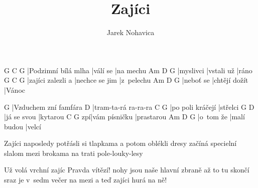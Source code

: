 \documentclass{song}
\author{Jarek Nohavica}
\title{Zajíci}
\begin{document}
\strophe
G                   C        G
|Podzimní bílá mlha |válí se |na mechu
Am        D          G
|myslivci |vstali už |ráno
G                 C              G
|zajíci zalezli a |nechce se jim |z~pelechu
Am        D             G
|neboť se |chtějí dožít |Vánoc
\endstrophe

G
|Vzduchem zní famfára
D
|tram-ta-rá ra-ra-ra
C                G
|po poli kráčejí |střelci
G           D
|já se svou |kytarou
   C             G
zpí|vám písničku |prastarou
Am        D           G
|o~tom že |malí budou |velcí
\endstrophe

\strophe*
Zajíci naposledy potřásli si tlapkama
a potom oblékli dresy
začíná specielní slalom mezi brokama
na trati pole-louky-lesy
\endstrophe

\strophe*
Už volá vrchní zajíc Pravda vítězí!
nohy jsou naše hlavní zbraně
až to tu skončí sraz je v~sedm večer na mezi
a teď zajíci hurá na ně!
\endstrophe
\end{document}
